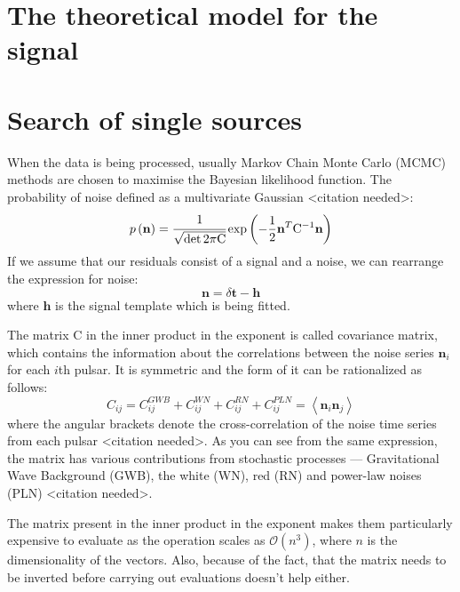 \documentclass{scrreprt}
\newcommand{\bigo}[1]{\ensuremath{\mathcal{O}\left( #1 \right)}}
\renewcommand{\vec}[1]{\ensuremath{\mathbf{#1}}}
\newcommand{\arr}[1]{\ensuremath{\mathrm{#1}}}
\begin{document}
    \section{The theoretical model for the signal}


    \section{Search of single sources}

    When the data is being processed, usually Markov Chain Monte Carlo (MCMC)
    methods are chosen to maximise the Bayesian likelihood function.
    The probability of noise defined as a multivariate Gaussian <citation
    needed>:
    \begin{equation}
        p \left( \vec{n} \right) = \cfrac{1}{\sqrt{\det 2\pi \arr{C}}}
        \exp{\left( - \frac{1}{2} \vec{n}^{T} \arr{C}^{-1} \vec{n} \right) }
    \end{equation}
    If we assume that our residuals consist of a signal and a noise, we can
    rearrange the expression for noise:
    \begin{equation}
        \vec{n} = \delta \vec{t} - \vec{h}
    \end{equation}
    where $\vec{h}$ is the signal template which is being fitted.

    The matrix $\arr{C}$ in the inner product in the exponent is called covariance
    matrix, which contains the information about the correlations between the
    noise series $\vec{n}_i$ for each $i$th pulsar.
    It is symmetric and the form of it can be rationalized as follows:
    \begin{equation}
        C_{ij} = C^{GWB}_{ij} + C^{WN}_{ij} + C^{RN}_{ij} + C^{PLN}_{ij} = \left<
        \vec{n}_i \vec{n}_j \right>
    \end{equation}
    where the angular brackets denote the cross-correlation of the noise time
    series from each pulsar <citation needed>.
    As you can see from the same expression, the matrix has various contributions
    from stochastic processes --- Gravitational Wave Background (GWB), the white
    (WN), red (RN) and power-law noises (PLN) <citation needed>.

    The matrix present in the inner product in the exponent makes them
    particularly expensive to evaluate as the operation scales as $\bigo{n^{3}}$,
    where $n$ is the dimensionality of the vectors.
    Also, because of the fact, that the matrix needs to be inverted before
    carrying out evaluations doesn't help either.
\end{document}
